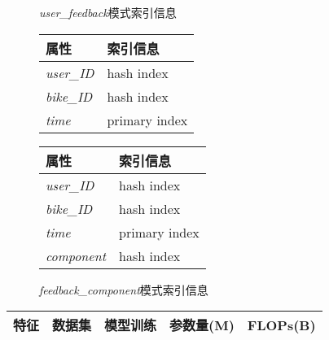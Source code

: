   \begin{figure}
    \begin{minipage}{0.4\textwidth}
      \centering
      \caption{\textit{user\_feedback}模式索引信息}
      \label{tab:indexuserfeedback}
      \begin{tabular}{ll}\toprule
        属性&索引信息\\\midrule
       \textit{user\_ID}&hash index\\
       \textit{bike\_ID}&hash index\\
       \textit{time}&primary index\\
       \bottomrule
      \end{tabular}
    \end{minipage}\hfill
    \begin{minipage}{0.4\textwidth}
    \centering
      \caption{\textit{feedback\_component}模式索引信息}
      \label{tab:indexfeedbackcomponent}
      \begin{tabular}{ll}\toprule
        属性&索引信息\\\midrule
       \textit{user\_ID}&hash index\\
       \textit{bike\_ID}&hash index\\
       \textit{time}&primary index\\
       \textit{component}&hash index\\
       \bottomrule
      \end{tabular}
    \end{minipage}\hfill
  \end{figure}

  \newpage

  \begin{table}
    \centering
  \begin{tabular}{lllll}\toprule
      特征&数据集&模型训练&参数量(M)&FLOPs(B)\\\midrule








     \bottomrule
    \end{tabular}
    \end{table}
  
